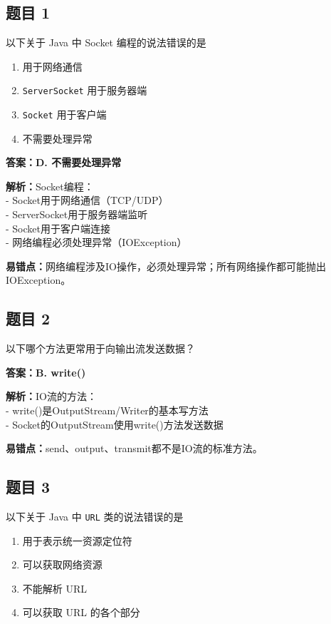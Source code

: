 \documentclass[12pt,a4paper]{ctexart}
\begin{document}
\subsection*{题目 1}
以下关于 Java 中 Socket 编程的说法错误的是
\begin{enumerate}[label=\Alph*.]
	\item 用于网络通信
	\item \texttt{ServerSocket} 用于服务器端
	\item \texttt{Socket} 用于客户端
	\item 不需要处理异常
\end{enumerate}

\begin{answerbox}
	\textbf{答案：D. 不需要处理异常}

	\textbf{解析：}Socket编程：\\
	- Socket用于网络通信（TCP/UDP）\\
	- ServerSocket用于服务器端监听\\
	- Socket用于客户端连接\\
	- 网络编程必须处理异常（IOException）

	\textbf{易错点：}网络编程涉及IO操作，必须处理异常；所有网络操作都可能抛出IOException。
\end{answerbox}

\subsection*{题目 2}
以下哪个方法更常用于向输出流发送数据？

\begin{answerbox}
	\textbf{答案：B. write()}

	\textbf{解析：}IO流的方法：\\
	- write()是OutputStream/Writer的基本写方法\\
	- Socket的OutputStream使用write()方法发送数据

	\textbf{易错点：}send、output、transmit都不是IO流的标准方法。
\end{answerbox}

\subsection*{题目 3}
以下关于 Java 中 \texttt{URL} 类的说法错误的是
\begin{enumerate}[label=\Alph*.]
	\item 用于表示统一资源定位符
	\item 可以获取网络资源
	\item 不能解析 URL
	\item 可以获取 URL 的各个部分
\end{enumerate}
\end{document}

